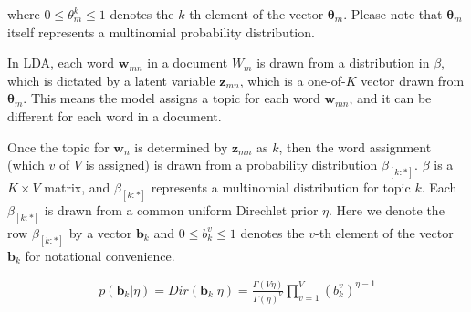 \documentclass[a4]{article}
\begin{document}
where $0 \le \theta_m^k \le 1$ denotes the $k$-th element of the vector
$\bm{\theta}_m$.
Please note that $\bm{\theta}_m$ itself represents a multinomial probability
distribution.

In LDA, each word $\mathbf{w}_{mn}$ in a document $W_m$ is drawn from a 
distribution in $\beta$, which is dictated by a latent variable 
$\mathbf{z}_{mn}$, which is a one-of-$K$ vector drawn from $\bm{\theta}_m$.
This means the model assigns a topic for each word $\mathbf{w}_{mn}$, and it 
can be different for each word in a document.

Once the topic for $\mathbf{w}_n$ is determined by $\mathbf{z}_{mn}$ as $k$,
then the word assignment (which $v$ of $V$ is assigned) is drawn from a 
probability distribution $\beta_{[k:*]}$. $\beta$ is a $K \times V$ matrix, 
and $\beta_{[k:*]}$ represents a multinomial distribution for topic $k$.
Each $\beta_{[k:*]}$ is drawn from a common uniform Direchlet prior $\eta$.
Here we denote the row $\beta_{[k:*]}$ by a vector $\mathbf{b}_k$
and  $0 \le b_k^v \le 1$ denotes the $v$-th element of the vector
$\mathbf{b}_k$ for notational convenience.

\begin{equation}
\begin{aligned}
p( \mathbf{b}_k | \eta )
    = Dir( \mathbf{b}_k | \eta )
    = \frac{ \Gamma( V \eta )  }
           { \Gamma(\eta)^V    }
      \prod_{v=1}^V ( b_k^v )^{\eta - 1}\label{p(b_k|eta)}\\
\end{aligned}
\end{equation}
\end{document}
